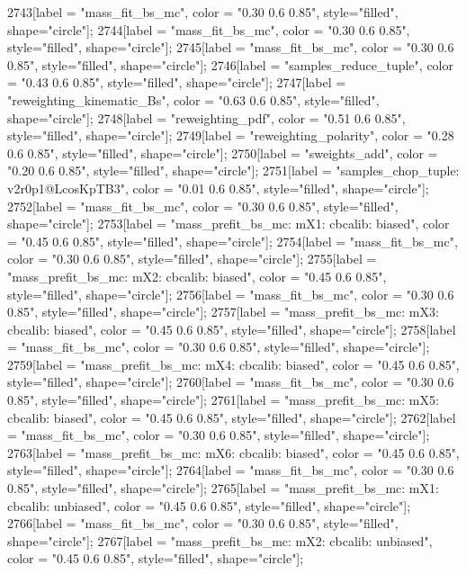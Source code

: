 {	2743[label = "mass_fit_bs_mc", color = "0.30 0.6 0.85", style="filled", shape="circle"];
	2744[label = "mass_fit_bs_mc", color = "0.30 0.6 0.85", style="filled", shape="circle"];
	2745[label = "mass_fit_bs_mc", color = "0.30 0.6 0.85", style="filled", shape="circle"];
	2746[label = "samples_reduce_tuple", color = "0.43 0.6 0.85", style="filled", shape="circle"];
	2747[label = "reweighting_kinematic_Bs", color = "0.63 0.6 0.85", style="filled", shape="circle"];
	2748[label = "reweighting_pdf", color = "0.51 0.6 0.85", style="filled", shape="circle"];
	2749[label = "reweighting_polarity", color = "0.28 0.6 0.85", style="filled", shape="circle"];
	2750[label = "sweights_add", color = "0.20 0.6 0.85", style="filled", shape="circle"];
	2751[label = "samples_chop_tuple\nversion: v2r0p1@LcosKpTB3", color = "0.01 0.6 0.85", style="filled", shape="circle"];
	2752[label = "mass_fit_bs_mc", color = "0.30 0.6 0.85", style="filled", shape="circle"];
	2753[label = "mass_prefit_bs_mc\nmassbin: mX1\nmassmodel: cbcalib\ntrigger: biased", color = "0.45 0.6 0.85", style="filled", shape="circle"];
	2754[label = "mass_fit_bs_mc", color = "0.30 0.6 0.85", style="filled", shape="circle"];
	2755[label = "mass_prefit_bs_mc\nmassbin: mX2\nmassmodel: cbcalib\ntrigger: biased", color = "0.45 0.6 0.85", style="filled", shape="circle"];
	2756[label = "mass_fit_bs_mc", color = "0.30 0.6 0.85", style="filled", shape="circle"];
	2757[label = "mass_prefit_bs_mc\nmassbin: mX3\nmassmodel: cbcalib\ntrigger: biased", color = "0.45 0.6 0.85", style="filled", shape="circle"];
	2758[label = "mass_fit_bs_mc", color = "0.30 0.6 0.85", style="filled", shape="circle"];
	2759[label = "mass_prefit_bs_mc\nmassbin: mX4\nmassmodel: cbcalib\ntrigger: biased", color = "0.45 0.6 0.85", style="filled", shape="circle"];
	2760[label = "mass_fit_bs_mc", color = "0.30 0.6 0.85", style="filled", shape="circle"];
	2761[label = "mass_prefit_bs_mc\nmassbin: mX5\nmassmodel: cbcalib\ntrigger: biased", color = "0.45 0.6 0.85", style="filled", shape="circle"];
	2762[label = "mass_fit_bs_mc", color = "0.30 0.6 0.85", style="filled", shape="circle"];
	2763[label = "mass_prefit_bs_mc\nmassbin: mX6\nmassmodel: cbcalib\ntrigger: biased", color = "0.45 0.6 0.85", style="filled", shape="circle"];
	2764[label = "mass_fit_bs_mc", color = "0.30 0.6 0.85", style="filled", shape="circle"];
	2765[label = "mass_prefit_bs_mc\nmassbin: mX1\nmassmodel: cbcalib\ntrigger: unbiased", color = "0.45 0.6 0.85", style="filled", shape="circle"];
	2766[label = "mass_fit_bs_mc", color = "0.30 0.6 0.85", style="filled", shape="circle"];
	2767[label = "mass_prefit_bs_mc\nmassbin: mX2\nmassmodel: cbcalib\ntrigger: unbiased", color = "0.45 0.6 0.85", style="filled", shape="circle"];
}
